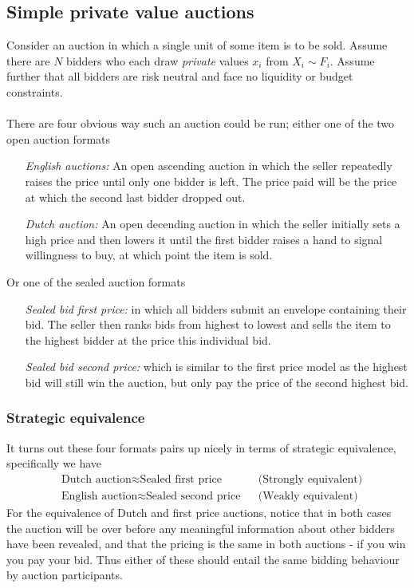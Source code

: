 \subsection{Simple private value auctions}
Consider an auction in which a single unit of some item is to be sold. Assume there are $N$ bidders who each draw \textit{private} values $x_i$ from $X_i \sim F_i$. Assume further that all bidders are risk neutral and face no liquidity or budget constraints.
\\ \\
There are four obvious way such an auction could be run; either one of the two open auction formats
\begin{enumerate}[align=left]
  \item[\textit{English auctions:}] An open ascending auction in which the seller repeatedly raises the price until only one bidder is left. The price paid will be the price at which the second last bidder dropped out.
  \item[\textit{Dutch auction:}] An open decending auction in which the seller initially sets a high price and then lowers it until the first bidder raises a hand to signal willingness to buy, at which point the item is sold.
\end{enumerate}
Or one of the sealed auction formats
\begin{enumerate}[align=left]
  \item[\textit{Sealed bid first price:}] in which all bidders submit an envelope containing their bid. The seller then ranks bids from highest to lowest and sells the item to the highest bidder at the price this individual bid.
  \item[\textit{Sealed bid second price:}] which is similar to the first price model as the highest bid will still win the auction, but only pay the price of the second highest bid.
\end{enumerate}

\subsubsection{Strategic equivalence}
It turns out these four formats pairs up nicely in terms of strategic equivalence, specifically we have
\begin{align*}
  &\textrm{Dutch auction} \approx \textrm{Sealed first price} && \textrm{(Strongly equivalent)}  \\
  &\textrm{English auction} \approx \textrm{Sealed second price} && \textrm{(Weakly equivalent)}
\end{align*}
For the equivalence of Dutch and first price auctions, notice that in both cases the auction will be over before any meaningful information about other bidders have been revealed, and that the pricing is the same in both auctions - if you win you pay your bid. Thus either of these should entail the same bidding behaviour by auction participants.

